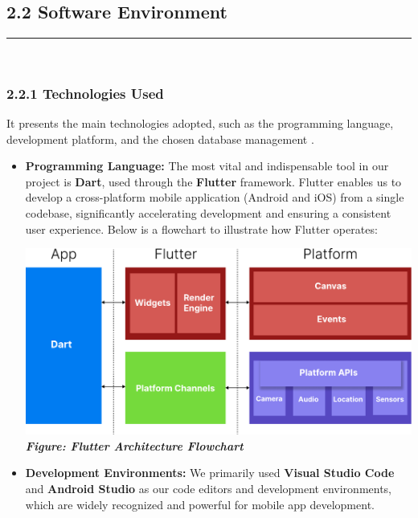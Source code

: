 \documentclass[12pt]{report}
\begin{document}
\subsection*{2.2 Software Environment}
\vspace{-0.3cm}
\rule{0.40\linewidth}{0.5pt} \\[-1.2cm]
\subsubsection*{2.2.1 Technologies Used}
It presents the main technologies adopted, such as the programming language, development platform, and the chosen database management .

\begin{itemize}
	\item \textbf{Programming Language:} The most vital and indispensable tool in our project is \textbf{Dart}, used through the \textbf{Flutter} framework. Flutter enables us to develop a cross-platform mobile application (Android and iOS) from a single codebase, significantly accelerating development and ensuring a consistent user experience. Below is a flowchart to illustrate how Flutter operates:
	      \vspace{0.5cm}
	      \begin{center}
		      \includegraphics[width=\linewidth]{images/FlutterDiagram@2x.pdf}
		      \textit{\textbf{Figure: Flutter Architecture Flowchart}}
	      \end{center}


	\item \textbf{Development Environments:} We primarily used \textbf{Visual Studio Code} and \textbf{Android Studio} as our code editors and development environments, which are widely recognized and powerful for mobile app development.


\end{itemize}
\end{document}
